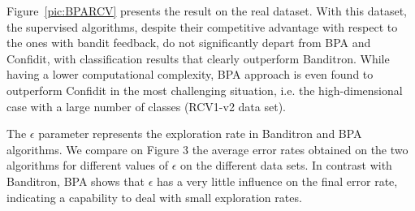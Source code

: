 \documentclass[twocolumn]{article}
\begin{document}

Figure~\ref{pic:BPARCV} %
presents the result on the real dataset. With this dataset, the supervised algorithms, despite their competitive advantage with respect to the ones with bandit feedback, do not significantly depart from BPA and Confidit, with classification results that clearly outperform Banditron. While having a lower computational complexity, BPA approach is even found to outperform Confidit in the most challenging situation, i.e. the high-dimensional case with a large number of classes (RCV1-v2 data set).

The $\epsilon$ parameter represents the exploration rate in Banditron and BPA algorithms. We compare on Figure 3 the average error rates obtained on the two algorithms for different values of $\epsilon$ on the different data sets. In contrast with Banditron, BPA shows that $\epsilon$ has a very little influence on the final error rate, indicating a capability to deal with small exploration rates.
\end{document}
